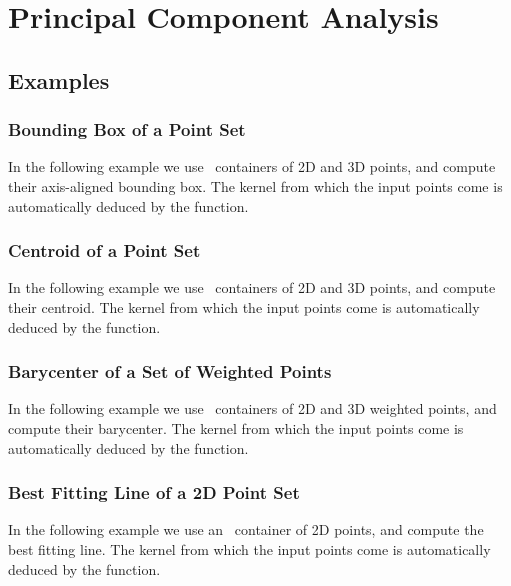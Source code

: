 \chapter{Principal Component Analysis}
\label{chap:pca}


\minitoc



\section{Examples}
\label{subsec:pca_examples}

\subsection{Bounding Box of a Point Set}

In the following example we use \stl\ containers of 2D and 3D points, and
compute their axis-aligned bounding box. The kernel from which the input points
come is automatically deduced by the function.


\subsection{Centroid of a Point Set}

In the following example we use \stl\ containers of 2D and 3D points, and
compute their centroid. The kernel from which the input points
come is automatically deduced by the function.


\subsection{Barycenter of a Set of Weighted Points}

In the following example we use \stl\ containers of 2D and 3D weighted points,
and compute their barycenter. The kernel from which the input points come is
automatically deduced by the function.


\subsection{Best Fitting Line of a 2D Point Set}

In the following example we use an \stl\ container of 2D points, and
compute the best fitting line. The kernel from which the input points
come is automatically deduced by the function.


